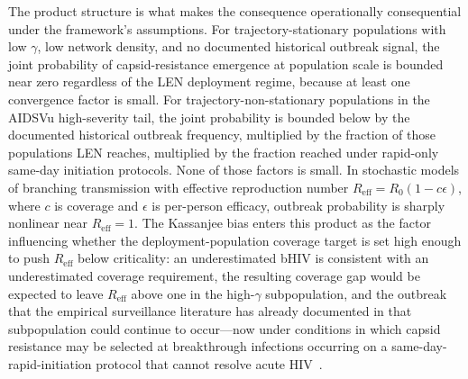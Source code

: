 \documentclass[11pt]{article}
\begin{document}
The product structure is what makes the consequence operationally consequential under the framework's assumptions. For trajectory-stationary populations with low $\gamma$, low network density, and no documented historical outbreak signal, the joint probability of capsid-resistance emergence at population scale is bounded near zero regardless of the LEN deployment regime, because at least one convergence factor is small. For trajectory-non-stationary populations in the AIDSVu high-severity tail, the joint probability is bounded below by the documented historical outbreak frequency, multiplied by the fraction of those populations LEN reaches, multiplied by the fraction reached under rapid-only same-day initiation protocols. None of those factors is small. In stochastic models of branching transmission with effective reproduction number $R_{\mathrm{eff}} = R_0(1 - c\epsilon)$, where $c$ is coverage and $\epsilon$ is per-person efficacy, outbreak probability is sharply nonlinear near $R_{\mathrm{eff}} = 1$. The Kassanjee bias enters this product as the factor influencing whether the deployment-population coverage target is set high enough to push $R_{\mathrm{eff}}$ below criticality: an underestimated bHIV is consistent with an underestimated coverage requirement, the resulting coverage gap would be expected to leave $R_{\mathrm{eff}}$ above one in the high-$\gamma$ subpopulation, and the outbreak that the empirical surveillance literature has already documented in that subpopulation could continue to occur---now under conditions in which capsid resistance may be selected at breakthrough infections occurring on a same-day-rapid-initiation protocol that cannot resolve acute HIV~\cite{wirden2024n74d,who_len_2025}.
\end{document}
